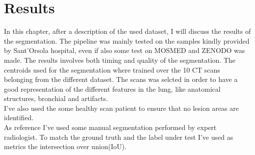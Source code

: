 \documentclass{standalone}
\begin{document}
	\chapter{Results}
	
	In this chapter, after a description of the used dataset, I will discuss the results of the segmentation. The pipeline was mainly tested on the samples kindly provided by Sant'Orsola hospital, even if also some test on MOSMED and ZENODO was made. The results involves both timing and quality of the segmentation. The centroids used for the segmentation where trained over the 10 CT scans belonging from the different dataset. The scans was selcted in order to have a good representation of the different features in the lung, like anatomical structures, bronchial and artifacts.\\
	I've also used the some healthy scan patient to ensure that no lesion areas are identified.\\
	As reference I've used some manual segmentation performed by expert radiologist. To match the ground truth and the label under test I've used as metrics the intersection over union(IoU).\\ 
\end{document}
